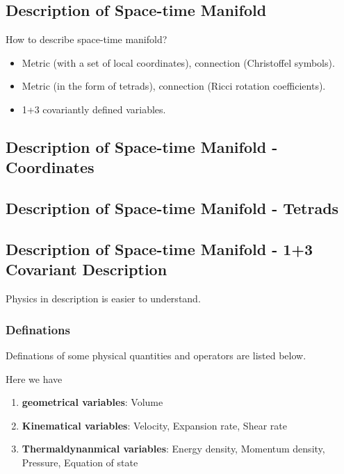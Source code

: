 \documentclass[letterpaper,10pt,english]{sphinxmanual}
\begin{document}
\subsection{Description of Space-time Manifold}
\label{relativity/GeneralRelativity:description-of-space-time-manifold}
How to describe space-time manifold?
\begin{itemize}
\item {} 
Metric (with a set of local coordinates), connection (Christoffel symbols).

\item {} 
Metric (in the form of tetrads), connection (Ricci rotation coefficients).

\item {} 
1+3 covariantly defined variables.

\end{itemize}


\subsection{Description of Space-time Manifold - Coordinates}
\label{relativity/GeneralRelativity:description-of-space-time-manifold-coordinates}

\subsection{Description of Space-time Manifold - Tetrads}
\label{relativity/GeneralRelativity:description-of-space-time-manifold-tetrads}

\subsection{Description of Space-time Manifold - 1+3 Covariant Description}
\label{relativity/GeneralRelativity:description-of-space-time-manifold-1-3-covariant-description}
Physics in description is easier to understand.


\subsubsection{Definations}
\label{relativity/GeneralRelativity:definations}
Definations of some physical quantities and operators are listed below.

Here we have
\begin{enumerate}
\item {} 
\textbf{geometrical variables}: Volume

\item {} 
\textbf{Kinematical variables}: Velocity, Expansion rate, Shear rate

\item {} 
\textbf{Thermaldynanmical variables}: Energy density, Momentum density, Pressure, Equation of state

\end{enumerate}
\end{document}
